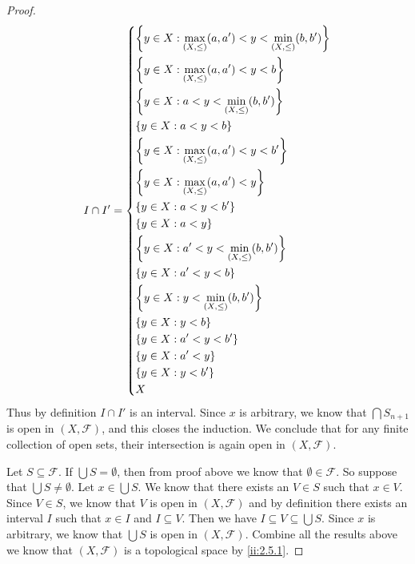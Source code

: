 \begin{proof}
  \[
    I \cap I' = \begin{dcases}
      \left\lbrace y \in X : \max_{(X, \leq)}(a, a') < y < \min_{(X, \leq)}(b, b')\right\rbrace \\
      \left\lbrace y \in X : \max_{(X, \leq)}(a, a') < y < b\right\rbrace                       \\
      \left\lbrace y \in X : a < y < \min_{(X, \leq)}(b, b')\right\rbrace                       \\
      \left\lbrace y \in X : a < y < b\right\rbrace                                             \\
      \left\lbrace y \in X : \max_{(X, \leq)}(a, a') < y < b'\right\rbrace                      \\
      \left\lbrace y \in X : \max_{(X, \leq)}(a, a') < y\right\rbrace                           \\
      \left\lbrace y \in X : a < y < b'\right\rbrace                                            \\
      \left\lbrace y \in X : a < y\right\rbrace                                                 \\
      \left\lbrace y \in X : a' < y < \min_{(X, \leq)}(b, b')\right\rbrace                      \\
      \left\lbrace y \in X : a' < y < b\right\rbrace                                            \\
      \left\lbrace y \in X : y < \min_{(X, \leq)}(b, b')\right\rbrace                           \\
      \left\lbrace y \in X : y < b\right\rbrace                                                 \\
      \left\lbrace y \in X : a' < y < b'\right\rbrace                                           \\
      \left\lbrace y \in X : a' < y\right\rbrace                                                \\
      \left\lbrace y \in X : y < b'\right\rbrace                                                \\
      X
    \end{dcases}
  \]
  Thus by definition \(I \cap I'\) is an interval.
  Since \(x\) is arbitrary, we know that \(\bigcap S_{n + 1}\) is open in \((X, \mathcal{F})\), and this closes the induction.
  We conclude that for any finite collection of open sets, their intersection is again open in \((X, \mathcal{F})\).

  Let \(S \subseteq \mathcal{F}\).
  If \(\bigcup S = \emptyset\), then from proof above we know that \(\emptyset \in \mathcal{F}\).
  So suppose that \(\bigcup S \neq \emptyset\).
  Let \(x \in \bigcup S\).
  We know that there exists an \(V \in S\) such that \(x \in V\).
  Since \(V \in S\), we know that \(V\) is open in \((X, \mathcal{F})\) and by definition there exists an interval \(I\) such that \(x \in I\) and \(I \subseteq V\).
  Then we have \(I \subseteq V \subseteq \bigcup S\).
  Since \(x\) is arbitrary, we know that \(\bigcup S\) is open in \((X, \mathcal{F})\).
  Combine all the results above we know that \((X, \mathcal{F})\) is a topological space by \cref{ii:2.5.1}.


\end{proof}

